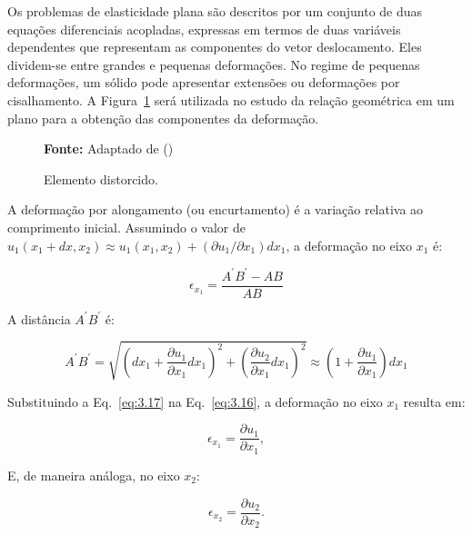 \indent Os problemas de elasticidade plana são descritos por um conjunto de duas equações diferenciais acopladas, expressas em termos de duas variáveis dependentes que representam as componentes do vetor deslocamento. Eles dividem-se entre grandes e pequenas deformações. No regime de pequenas deformações, um sólido pode apresentar extensões ou deformações por cisalhamento. A Figura~\ref{fig:3.9} será utilizada no estudo da relação geométrica em um plano para a obtenção das componentes da deformação. 


\begin{figure}[H]
    \centering
    \caption{Elemento distorcido.}
    \resizebox{0.9\textwidth}{!}{}
    \label{fig:3.9}

    {\small \textbf{Fonte:} Adaptado de (\citet{elasticitytheoryapplicationsnumerics2021})}
\end{figure}


\indent A deformação por alongamento (ou encurtamento) é a variação relativa ao comprimento inicial. Assumindo o valor de $u_1(x_1 + dx,x_2) \approx u_1(x_1,x_2) + (\partial u_1 / \partial x_1) dx_1$, a deformação no eixo $x_1$ é:

\begin{equation}
    \epsilon_{x_1} = \frac{A^{\prime}B^{\prime} - AB}{AB}
    \label{eq:3.16}
\end{equation}

\indent A distância $A^{\prime}B^{\prime}$ é:

\begin{equation}
    A^{\prime}B^{\prime} = \sqrt{\left( dx_1 + \frac{\partial u_1}{\partial x_1}dx_1 \right)^2 + \left( \frac{\partial u_2}{\partial x_1}dx_1 \right)^2} \approx \left( 1 + \frac{\partial u_1}{\partial x_1} \right) dx_1
    \label{eq:3.17}
\end{equation}

\indent Substituindo a Eq.~\ref{eq:3.17} na Eq.~\ref{eq:3.16}, a deformação no eixo $x_1$ resulta em: 

\begin{equation}
    \epsilon_{x_1} =  \frac{\partial u_1}{\partial x_1},
    \label{eq:3.18}
\end{equation}


\indent E, de maneira análoga, no eixo $x_2$: 

\begin{equation}
    \epsilon_{x_2} =  \frac{\partial u_2}{\partial x_2}.
    \label{eq:3.19}
\end{equation}


